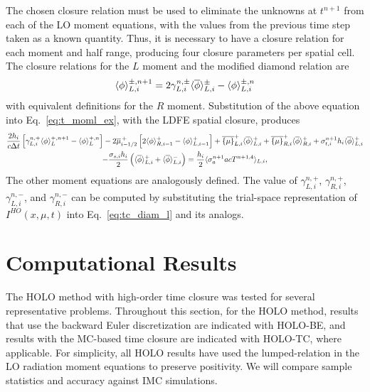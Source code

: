 The chosen closure relation must be used to eliminate the unknowns at $t^{n+1}$ from each
of the LO moment equations, with the values from the previous time step taken as a known quantity.  Thus, it is necessary to have a closure relation for each moment and half
range, producing four closure parameters per spatial cell.  The closure relations for the
$L$ moment and the modified diamond relation are
\begin{equation}\label{eq:tc_diam_l}
    \langle \phi \rangle_{L,i}^{\pm,n+1} = 2 \gamma_{L,i}^{n,\pm}\langle \overline\phi \rangle_{L,i}^{\pm} -
    \langle \phi \rangle_{L,i}^{\pm,n}
\end{equation}
with equivalent definitions for the $R$ moment.  Substitution of the above equation into
Eq.~\eqref{eq:t_moml_ex}, with the LDFE spatial closure, produces
\begin{multline}
    \frac{2h_i}{c\Delta t}\left[ \gamma_{L,i}^{n,+} \langle \phi \rangle_L^{+,n+1} - \langle \phi \rangle_L^{+,n} \right]
    -2\overline {\mu}_{i-1/2}^{\,+}\left[ 2\langle \phi \rangle_{R,i-1}^+ -
    \langle \phi \rangle_{L,i-1}^+\right] + \overline{\left\{ \mu \right\}}_{L,i}^{+}
  \langle \overline{\phi} \rangle_{L,i}^{+}
  +  \overline{\left\{ \mu \right\}}_{R,i}^{+}
  \langle \overline{\phi} \rangle_{R,i}^{+} +  \sigma_{t,i}^{n+1} h_i 
  \langle \overline\phi \rangle_{L,i}^{+} \\-  \frac{\sigma_{s,i} h_i}{2} \left( \langle \overline{\phi} \rangle_{L,i}^{+} +
  \langle \overline{\phi} \rangle_{L,i}^{-}\right) = \frac{h_i}{2} \langle \sigma_a^{n+1} a c T^{n+1,4} \rangle_{L,i},
\end{multline}
The other moment equations are analogously defined.  
The value of $\gamma_{L,i}^{n,+}$, $\gamma_{R,i}^{n,+}$, $\gamma_{L,i}^{n,-}$, and
    $\gamma_{R,i}^{n,-}$
can be computed by substituting the trial-space representation of $I^{HO}(x,\mu,t)$ into
Eq.~\eqref{eq:tc_diam_l} and its analogs.

\section{Computational Results}

The HOLO method with high-order time closure was tested for several
representative problems. Throughout this section, for the HOLO method, results that use the
backward Euler discretization are indicated with HOLO-BE, and results with the MC-based time
closure are indicated with HOLO-TC, where applicable.  For simplicity, all HOLO
results have used the lumped-relation in the LO radiation moment equations to
preserve positivity. We will compare sample statistics and accuracy against IMC
simulations.  

